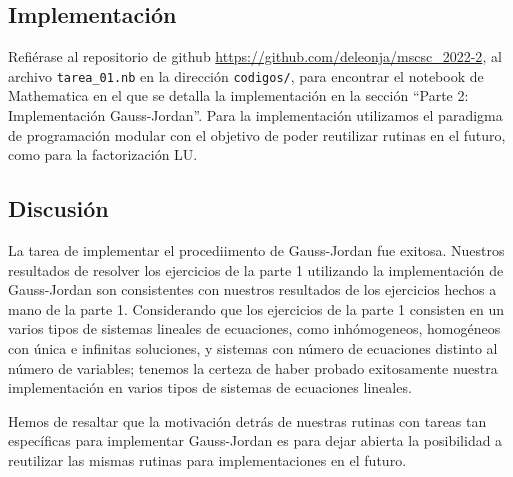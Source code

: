 \documentclass[11pt,letterpaper]{article}
\begin{document}
\subsection{Implementación}
Refiérase al repositorio de github \href{https://github.com/deleonja/mscsc\_2022-2}
{https://github.com/deleonja/mscsc\_2022-2}, al archivo \verb|tarea_01.nb|
en la dirección \verb|codigos/|, para encontrar el notebook de Mathematica
en el que se detalla la implementación en la sección ``Parte 2: Implementación
Gauss-Jordan''. 
Para la implementación utilizamos
el paradigma de programación modular con el objetivo de poder reutilizar 
rutinas en el futuro, como para la factorización LU.

\subsection{Discusión}
La tarea de implementar el procediimento de Gauss-Jordan fue exitosa. 
Nuestros resultados de resolver los ejercicios de la parte 1 utilizando 
la implementación de Gauss-Jordan son consistentes con nuestros
resultados de los ejercicios hechos a mano de la parte 1. 
Considerando que los ejercicios de 
la parte 1 consisten en un varios tipos de sistemas lineales de ecuaciones,
como inhómogeneos, homogéneos con única e infinitas soluciones, y sistemas 
con número de ecuaciones distinto al número de variables; tenemos
la certeza de haber probado exitosamente 
nuestra implementación en varios tipos de sistemas de ecuaciones lineales. 

Hemos de resaltar que la motivación detrás de nuestras rutinas con tareas 
tan específicas para implementar Gauss-Jordan es para dejar abierta la posibilidad
a reutilizar las mismas rutinas para implementaciones en el futuro.
\end{document}
